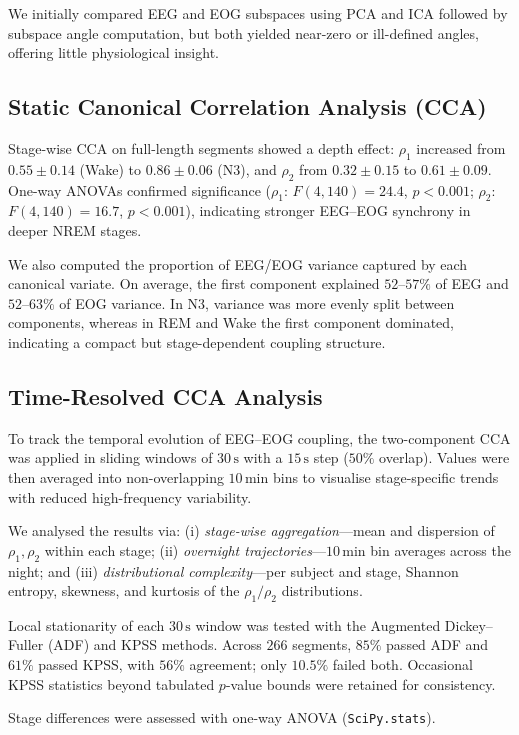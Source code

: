 We initially compared EEG and EOG subspaces using PCA and ICA followed by subspace angle computation, but both yielded near-zero or ill-defined angles, offering little physiological insight. 

\subsection{Static Canonical Correlation Analysis (CCA)}
Stage-wise CCA on full-length segments showed a depth effect: $\rho_1$ increased from $0.55 \pm 0.14$ (Wake) to $0.86 \pm 0.06$ (N3), and $\rho_2$ from $0.32 \pm 0.15$ to $0.61 \pm 0.09$. One-way ANOVAs confirmed significance ($\rho_1$: $F(4,140)=24.4$, $p<0.001$; $\rho_2$: $F(4,140)=16.7$, $p<0.001$), indicating stronger EEG--EOG synchrony in deeper NREM stages.

We also computed the proportion of EEG/EOG variance captured by each canonical variate. On average, the first component explained $52$--$57\%$ of EEG and $52$--$63\%$ of EOG variance. In N3, variance was more evenly split between components, whereas in REM and Wake the first component dominated, indicating a compact but stage-dependent coupling structure.

\subsection{Time-Resolved CCA Analysis}
To track the temporal evolution of EEG--EOG coupling, the two-component CCA was applied in sliding windows of $30\,\mathrm{s}$ with a $15\,\mathrm{s}$ step ($50\%$ overlap). Values were then averaged into non-overlapping $10\,\mathrm{min}$ bins to visualise stage-specific trends with reduced high-frequency variability.

We analysed the results via: (i) \emph{stage-wise aggregation}---mean and dispersion of $\rho_1,\rho_2$ within each stage; (ii) \emph{overnight trajectories}---$10\,\mathrm{min}$ bin averages across the night; and (iii) \emph{distributional complexity}---per subject and stage, Shannon entropy, skewness, and kurtosis of the $\rho_1/\rho_2$ distributions.

Local stationarity of each $30\,\mathrm{s}$ window was tested with the Augmented Dickey--Fuller (ADF) and KPSS methods. Across $266$ segments, $85\%$ passed ADF and $61\%$ passed KPSS, with $56\%$ agreement; only $10.5\%$ failed both. Occasional KPSS statistics beyond tabulated $p$-value bounds were retained for consistency.

Stage differences were assessed with one-way ANOVA (\texttt{SciPy.stats}).

